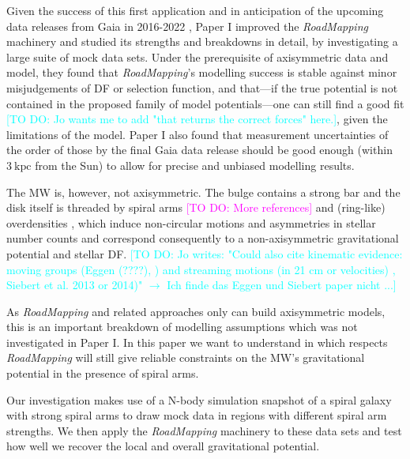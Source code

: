 \documentclass[iop,revtex4,numberedappendix,appendixfloats]{emulateapj}
\newcommand{\RM}{{\sl RoadMapping}}
\newcommand{\Wilma}[1]{\textcolor{Magenta}{#1}}
\newcommand{\Jo}[1]{\textcolor{Cyan}{#1}}
\begin{document}
Given the success of this first application and in anticipation of the upcoming data releases from Gaia in 2016-2022 \citep{2013CEAB...37..115E}, Paper I improved the \RM{} machinery and studied its strengths and breakdowns in detail, by investigating a large suite of mock data sets. Under the prerequisite of axisymmetric data and model, they found that \RM{}'s modelling success is stable against minor misjudgements of DF or selection function, and that---if the true potential is not contained in the proposed family of model potentials---one can still find a good fit \Jo{[TO DO: Jo wants me to add "that returns the correct forces" here.]}, given the limitations of the model. Paper I also found that measurement uncertainties of the order of those by the final Gaia data release should be good enough (within $3~\text{kpc}$ from the Sun) to allow for precise and unbiased modelling results. 

The MW is, however, not axisymmetric. The bulge contains a strong bar \citep{1980ApJ...236..779L,1991ApJ...379..631B,2000MNRAS.317L..45H,2013MNRAS.435.1874W} and the disk itself is threaded by spiral arms \citep{1958MNRAS.118..379O,1976A&A....49...57G,2009PASP..121..213C,2014ApJ...783..130R} \Wilma{[TO DO: More references]} and (ring-like) overdensities \citep{2002ApJ...569..245N,2008ApJ...673..864J,2015ApJ...801..105X}, which induce non-circular motions and asymmetries in stellar number counts and correspond consequently to a non-axisymmetric gravitational potential and stellar DF. \Jo{[TO DO: Jo writes: "Could also cite kinematic evidence: moving groups (Eggen (????), \citet{1998AJ....115.2384D,2005A&A...430..165F,2009ApJ...700.1794B,2010ApJ...717..617B}) and streaming motions (in 21 cm or velocities) \citep{2015ApJ...800...83B,2013MNRAS.436..101W}, Siebert et al. 2013 or 2014)" $\longrightarrow$ Ich finde das Eggen und Siebert paper nicht ...]}

As \RM{}  and related approaches only can build axisymmetric models, this is an important breakdown of modelling assumptions which was not investigated in Paper I. In this paper we want to understand in which respects \RM{} will still give reliable constraints on the MW's gravitational potential in the presence of spiral arms.

Our investigation makes use of a N-body simulation snapshot of a spiral galaxy with strong spiral arms \citep{2013ApJ...766...34D} to draw mock data in regions with different spiral arm strengths. We then apply the \RM{} machinery to these data sets and test how well we recover the local and overall gravitational potential.
\end{document}
